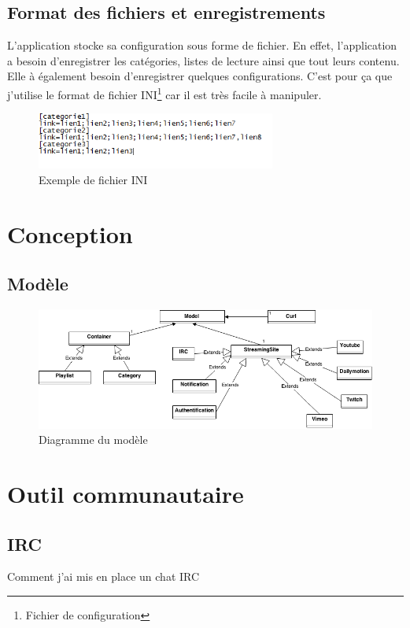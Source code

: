 \documentclass[11pt]{report} %
\begin{document}
		\subsection{Format des fichiers et enregistrements}
		L'application stocke sa configuration sous forme de fichier. En effet, l'application a besoin d'enregistrer les catégories, listes de lecture ainsi que tout leurs contenu. Elle à également besoin d'enregistrer quelques configurations. C'est pour ça que j'utilise le format de fichier INI\footnote{Fichier de configuration} car il est très facile à manipuler. 
		
		\begin{figure}[h]
			\center
			\includegraphics[width=0.7\textwidth]{../img/inifile.png}
			\caption{Exemple de fichier INI}
			\label{inifile}
		\end{figure}
	
	\section{Conception}
		\subsection{Modèle}
		\begin{figure}[h]
			\center
			\includegraphics[width=1\textwidth]{../img/Model.png}
			\caption{Diagramme du modèle}
			\label{model}
		\end{figure}

	
	\section{Outil communautaire}
		\subsection{IRC}
		Comment j'ai mis en place un chat IRC
		
\end{document}
